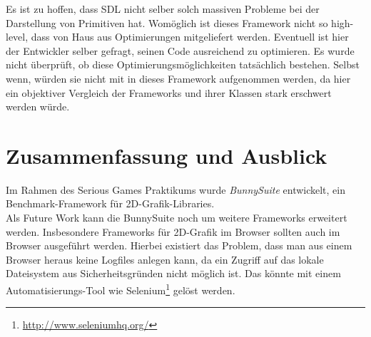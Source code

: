 Es ist zu hoffen, dass SDL nicht selber solch massiven Probleme bei der Darstellung von Primitiven hat. Womöglich ist dieses Framework nicht so high-level, dass von Haus aus Optimierungen mitgeliefert werden. Eventuell ist hier der Entwickler selber gefragt, seinen Code ausreichend zu optimieren. Es wurde nicht überprüft, ob diese Optimierungsmöglichkeiten tatsächlich bestehen. Selbst wenn, würden sie nicht mit in dieses Framework aufgenommen werden, da hier ein objektiver Vergleich der Frameworks und ihrer Klassen stark erschwert werden würde.

\chapter{Zusammenfassung und Ausblick}
Im Rahmen des Serious Games Praktikums wurde \textit{BunnySuite} entwickelt, ein Benchmark-Framework für 2D-Grafik-Libraries. 
\\
Als Future Work kann die BunnySuite noch um weitere Frameworks erweitert werden. Insbesondere Frameworks für 2D-Grafik im Browser sollten auch im Browser ausgeführt werden. Hierbei existiert das Problem, dass man aus einem Browser heraus keine Logfiles anlegen kann, da ein Zugriff auf das lokale Dateisystem aus Sicherheitsgründen nicht möglich ist. Das könnte mit einem Automatisierungs-Tool wie Selenium\footnote{\url{http://www.seleniumhq.org/}} gelöst werden.
